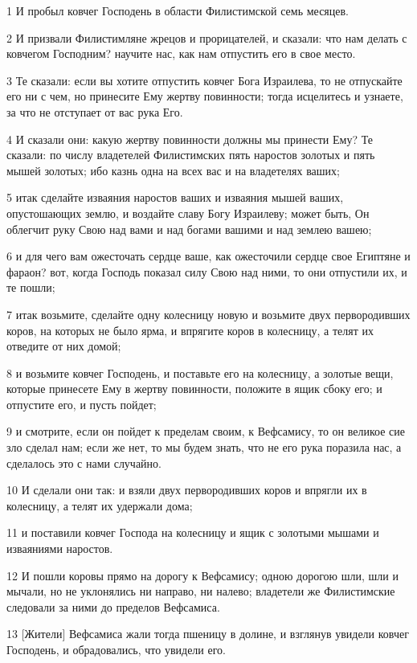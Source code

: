\par 1 И пробыл ковчег Господень в области Филистимской семь месяцев.
\par 2 И призвали Филистимляне жрецов и прорицателей, и сказали: что нам делать с ковчегом Господним? научите нас, как нам отпустить его в свое место.
\par 3 Те сказали: если вы хотите отпустить ковчег Бога Израилева, то не отпускайте его ни с чем, но принесите Ему жертву повинности; тогда исцелитесь и узнаете, за что не отступает от вас рука Его.
\par 4 И сказали они: какую жертву повинности должны мы принести Ему? Те сказали: по числу владетелей Филистимских пять наростов золотых и пять мышей золотых; ибо казнь одна на всех вас и на владетелях ваших;
\par 5 итак сделайте изваяния наростов ваших и изваяния мышей ваших, опустошающих землю, и воздайте славу Богу Израилеву; может быть, Он облегчит руку Свою над вами и над богами вашими и над землею вашею;
\par 6 и для чего вам ожесточать сердце ваше, как ожесточили сердце свое Египтяне и фараон? вот, когда Господь показал силу Свою над ними, то они отпустили их, и те пошли;
\par 7 итак возьмите, сделайте одну колесницу новую и возьмите двух первородивших коров, на которых не было ярма, и впрягите коров в колесницу, а телят их отведите от них домой;
\par 8 и возьмите ковчег Господень, и поставьте его на колесницу, а золотые вещи, которые принесете Ему в жертву повинности, положите в ящик сбоку его; и отпустите его, и пусть пойдет;
\par 9 и смотрите, если он пойдет к пределам своим, к Вефсамису, то он великое сие зло сделал нам; если же нет, то мы будем знать, что не его рука поразила нас, а сделалось это с нами случайно.
\par 10 И сделали они так: и взяли двух первородивших коров и впрягли их в колесницу, а телят их удержали дома;
\par 11 и поставили ковчег Господа на колесницу и ящик с золотыми мышами и изваяниями наростов.
\par 12 И пошли коровы прямо на дорогу к Вефсамису; одною дорогою шли, шли и мычали, но не уклонялись ни направо, ни налево; владетели же Филистимские следовали за ними до пределов Вефсамиса.
\par 13 [Жители] Вефсамиса жали тогда пшеницу в долине, и взглянув увидели ковчег Господень, и обрадовались, что увидели его.
